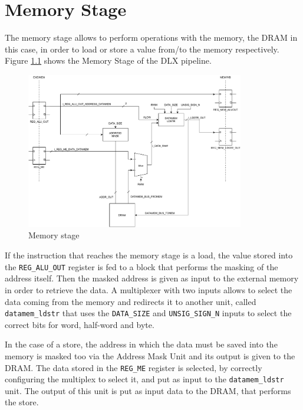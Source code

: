 \chapter{Memory Stage}
\label{chp:memory_stage}
The memory stage allows to perform operations with the memory, the DRAM in this case, in order to load or store a value from/to the memory respectively. Figure \ref{fig:mem_stage} shows the Memory Stage of the DLX pipeline.

\begin{figure}[H]   
    \centering
    \includegraphics[width=0.85\textwidth]{chapters/6_MemoryStage/images/mem_stage.pdf}
    \caption{Memory stage}
    \label{fig:mem_stage}
\end{figure}

If the instruction that reaches the memory stage is a load, the value stored into the \texttt{REG\_ALU\_OUT} register is fed to a block that performs the masking of the address itself. Then the masked address is given as input to the external memory in order to retrieve the data. A multiplexer with two inputs allows to select the data coming from the memory and redirects it to another unit, called \texttt{datamem\_ldstr} that uses the \texttt{DATA\_SIZE} and \texttt{UNSIG\_SIGN\_N} inputs to select the correct bits for word, half-word and byte.

In the case of a store, the address in which the data must be saved into the memory is masked too via the Address Mask Unit and its output is given to the DRAM. The data stored in the \texttt{REG\_ME} register is selected, by correctly configuring the multiplex to select it, and put as input to the \texttt{datamem\_ldstr} unit. The output of this unit is put as input data to the DRAM, that performs the store.

